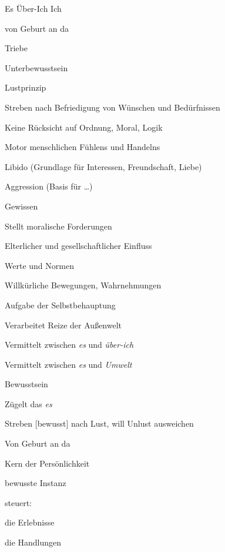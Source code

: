 \startsection[title={2024-08-20 - Der seelische Apparat nach
Freud},reference={2024-08-20-Der seelische Apparat nach Freud}]

\NC Es \VL Über-Ich \VL Ich \SR
\HL
\NC
\startitemize[packed]
\item
  von Geburt an da
\item
  Triebe
\item
  Unterbewusstsein
\item
  Lustprinzip
\item
  Streben nach Befriedigung von Wünschen und Bedürfnissen
\item
  Keine Rücksicht auf Ordnung, Moral, Logik
\item
  Motor menschlichen Fühlens und Handelns
\item
  Libido (Grundlage für Interessen, Freundschaft, Liebe)
\item
  Aggression (Basis für \ldots{})
\stopitemize
\VL
\startitemize[packed]
\item
  Gewissen
\item
  Stellt moralische Forderungen
\item
  Elterlicher und gesellschaftlicher Einfluss
\item
  Werte und Normen
\stopitemize
\VL
\startitemize[packed]
\item
  Willkürliche Bewegungen, Wahrnehmungen
\item
  Aufgabe der Selbstbehauptung
\item
  Verarbeitet Reize der Außenwelt
\item
  Vermittelt zwischen {\em es} und {\em über-ich}
\item
  Vermittelt zwischen {\em es} und {\em Umwelt}
\item
  Bewusstsein
\item
  Zügelt das {\em es}
\item
  Streben {[}bewusst{]} nach Lust, will Unlust ausweichen
\stopitemize
\SR
\stoptable

\startsectionlevel[title={Es},reference={es}]

\startitemize[packed]
\item
  Von Geburt an da
\item
\stopitemize

\stopsectionlevel

\startsectionlevel[title={Ich},reference={ich}]

\startitemize[packed]
\item
  Kern der Persönlichkeit
\item
  bewusste Instanz
\item
  steuert:
  \startitemize[packed]
  \item
    die Erlebnisse
  \item
    die Handlungen
  \stopitemize
\stopitemize

